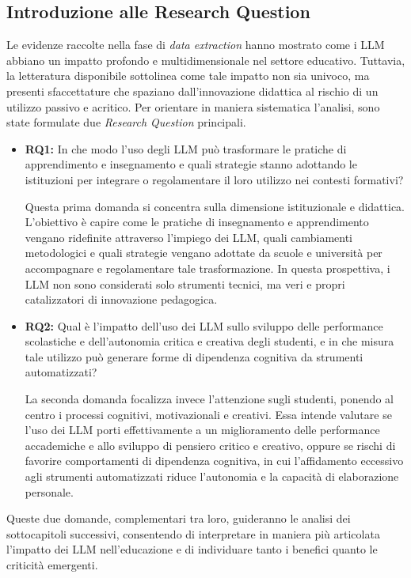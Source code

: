 \documentclass[a4paper,9pt]{article}
\begin{document}
\subsection{Introduzione alle Research Question}

Le evidenze raccolte nella fase di \emph{data extraction} hanno mostrato come i LLM abbiano un impatto profondo e multidimensionale nel settore educativo. Tuttavia, la letteratura disponibile sottolinea come tale impatto non sia univoco, ma presenti sfaccettature che spaziano dall’innovazione didattica al rischio di un utilizzo passivo e acritico. Per orientare in maniera sistematica l’analisi, sono state formulate due \emph{Research Question} principali.

\begin{itemize}
	\item \textbf{RQ1:} In che modo l’uso degli LLM può trasformare le pratiche di apprendimento e insegnamento e quali strategie stanno adottando le istituzioni per integrare o regolamentare il loro utilizzo nei contesti formativi?
	
	Questa prima domanda si concentra sulla dimensione istituzionale e didattica. L’obiettivo è capire come le pratiche di insegnamento e apprendimento vengano ridefinite attraverso l’impiego dei LLM, quali cambiamenti metodologici e quali strategie vengano adottate da scuole e università per accompagnare e regolamentare tale trasformazione. In questa prospettiva, i LLM non sono considerati solo strumenti tecnici, ma veri e propri catalizzatori di innovazione pedagogica.
	
	\item \textbf{RQ2:} Qual è l’impatto dell’uso dei LLM sullo sviluppo delle performance scolastiche e dell’autonomia critica e creativa degli studenti, e in che misura tale utilizzo può generare forme di dipendenza cognitiva da strumenti automatizzati?
	
	La seconda domanda focalizza invece l’attenzione sugli studenti, ponendo al centro i processi cognitivi, motivazionali e creativi. Essa intende valutare se l’uso dei LLM porti effettivamente a un miglioramento delle performance accademiche e allo sviluppo di pensiero critico e creativo, oppure se rischi di favorire comportamenti di dipendenza cognitiva, in cui l’affidamento eccessivo agli strumenti automatizzati riduce l’autonomia e la capacità di elaborazione personale.
\end{itemize}
Queste due domande, complementari tra loro, guideranno le analisi dei sottocapitoli successivi, consentendo di interpretare in maniera più articolata l’impatto dei LLM nell’educazione e di individuare tanto i benefici quanto le criticità emergenti.
\end{document}
